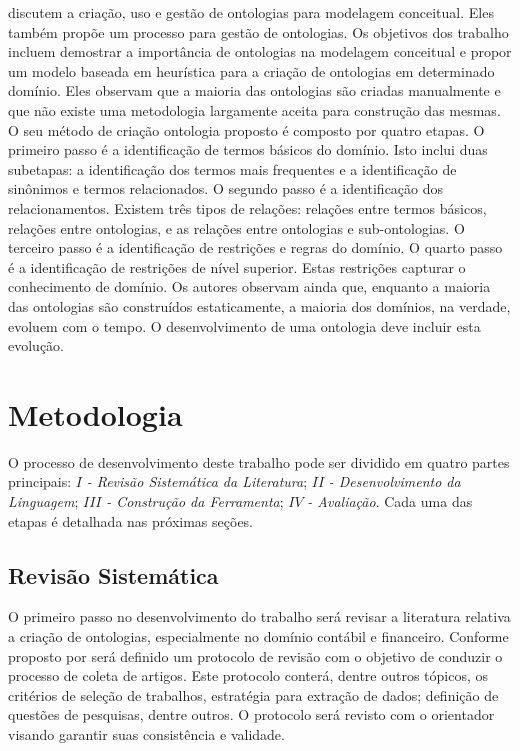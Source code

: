 \documentclass[msc,proposal,hidelot,hideabstract]{ppgccufmg} %
\begin{document}
\cite{sugumaran2002ontologies} discutem a criação, uso e gestão de ontologias para modelagem conceitual. Eles também propõe um processo para gestão de ontologias. Os objetivos dos trabalho incluem demostrar a importância de ontologias na modelagem conceitual e propor um modelo baseada em heurística  para a criação de ontologias em determinado domínio. Eles observam que a maioria das ontologias são criadas manualmente e que não existe uma metodologia largamente aceita para construção das mesmas. O seu método de criação ontologia proposto é composto por quatro etapas. O primeiro passo é a identificação de termos básicos do domínio. Isto inclui duas subetapas: a identificação dos termos mais frequentes e a identificação de sinônimos e termos relacionados. O segundo passo é a identificação dos relacionamentos. Existem três tipos de relações: relações entre termos básicos, relações entre ontologias, e as relações entre ontologias e sub-ontologias. O terceiro passo é a identificação de restrições e regras do domínio. O quarto passo é a identificação de restrições de nível superior. Estas restrições capturar o conhecimento de domínio. Os autores observam ainda que, enquanto a maioria das ontologias são construídos estaticamente, a maioria dos domínios, na verdade, evoluem com o tempo. O desenvolvimento de uma ontologia deve incluir esta evolução.

\chapter{Metodologia}
\label{ch:metodologia}

O processo de desenvolvimento deste trabalho pode ser dividido em quatro partes principais: $I$\textit{ - Revisão Sistemática da Literatura}; $II$\textit{ - Desenvolvimento da Linguagem}; $III$\textit{ - Construção da Ferramenta}; $IV$\textit{ - Avaliação}. Cada uma das etapas é detalhada nas próximas seções.

\section{Revisão Sistemática}
\label{sec:revisao_sistematica}

O primeiro passo no desenvolvimento do trabalho será revisar a literatura relativa a criação de ontologias, especialmente no domínio contábil e financeiro. Conforme proposto por \cite{wohlin2012experimentation} será definido um protocolo de revisão com o objetivo de conduzir o processo de coleta de artigos. Este protocolo conterá, dentre outros tópicos, os critérios de seleção de trabalhos, estratégia para extração de dados; definição de questões de pesquisas, dentre outros. O protocolo será revisto com o orientador visando garantir suas consistência e validade.
\end{document}
